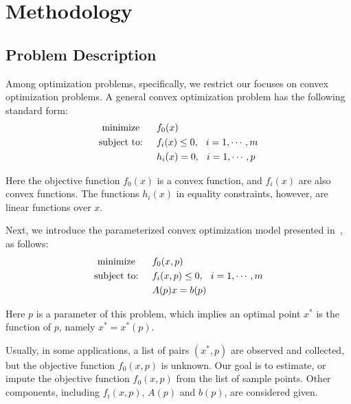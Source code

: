 \section{Methodology}\label{sec:methodology}

\subsection{Problem Description}

Among optimization problems, specifically, we restrict our focuses on convex optimization problems. A general convex optimization problem has the following standard form:
\begin{align}
\begin{split}\label{p1}
\textrm{minimize }\hspace{.2in}&f_0(x)\\
\textrm{subject to:}\hspace{.2in}&f_i(x)\le0,\hspace{.1in}i=1,\cdots,m\\
&h_i(x)=0,\hspace{.1in}i=1,\cdots,p
\end{split}
\end{align}

Here the objective function $f_0(x)$ is a convex function, and $f_i(x)$ are also convex functions. The functions $h_i(x)$ in equality constraints, however, are linear functions over $x$.

Next, we introduce the parameterized convex optimization model presented in~\cite{keshavarz2011}, as follows:
\begin{align}
\begin{split}\label{p2}
\textrm{minimize }\hspace{.2in}&f_0(x,p)\\
\textrm{subject to:}\hspace{.2in}&f_i(x,p)\le0,\hspace{.1in}i=1,\cdots,m\\
&A(p)x=b(p)
\end{split}
\end{align}

Here $p$ is a parameter of this problem, which implies an optimal point $x^*$ is the function of $p$, namely $x^*=x^*(p)$.

Usually, in some applications, a list of pairs $(x^*,p)$ are observed and collected, but the objective function $f_0(x,p)$ is unknown. Our goal is to estimate, or impute the objective function $f_0(x,p)$ from the list of sample points. Other components, including $f_i(x,p)$, $A(p)$ and $b(p)$, are considered given.

